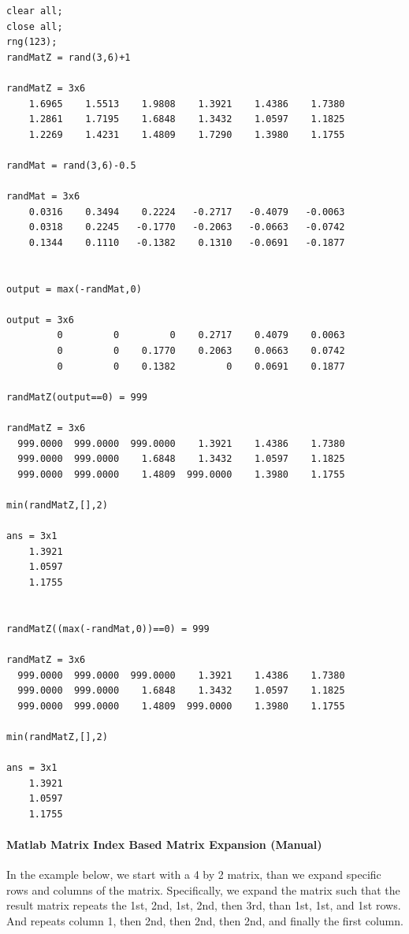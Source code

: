 \documentclass[
]{book}
\begin{document}
\begin{verbatim}
clear all;
close all;
rng(123);
randMatZ = rand(3,6)+1

randMatZ = 3x6    
    1.6965    1.5513    1.9808    1.3921    1.4386    1.7380
    1.2861    1.7195    1.6848    1.3432    1.0597    1.1825
    1.2269    1.4231    1.4809    1.7290    1.3980    1.1755

randMat = rand(3,6)-0.5

randMat = 3x6    
    0.0316    0.3494    0.2224   -0.2717   -0.4079   -0.0063
    0.0318    0.2245   -0.1770   -0.2063   -0.0663   -0.0742
    0.1344    0.1110   -0.1382    0.1310   -0.0691   -0.1877


output = max(-randMat,0)

output = 3x6    
         0         0         0    0.2717    0.4079    0.0063
         0         0    0.1770    0.2063    0.0663    0.0742
         0         0    0.1382         0    0.0691    0.1877

randMatZ(output==0) = 999

randMatZ = 3x6    
  999.0000  999.0000  999.0000    1.3921    1.4386    1.7380
  999.0000  999.0000    1.6848    1.3432    1.0597    1.1825
  999.0000  999.0000    1.4809  999.0000    1.3980    1.1755

min(randMatZ,[],2)

ans = 3x1    
    1.3921
    1.0597
    1.1755


randMatZ((max(-randMat,0))==0) = 999

randMatZ = 3x6    
  999.0000  999.0000  999.0000    1.3921    1.4386    1.7380
  999.0000  999.0000    1.6848    1.3432    1.0597    1.1825
  999.0000  999.0000    1.4809  999.0000    1.3980    1.1755

min(randMatZ,[],2)

ans = 3x1    
    1.3921
    1.0597
    1.1755
\end{verbatim}

\hypertarget{matlab-matrix-index-based-matrix-expansion-manual}{%
\paragraph{Matlab Matrix Index Based Matrix Expansion (Manual)}\label{matlab-matrix-index-based-matrix-expansion-manual}}

In the example below, we start with a 4 by 2 matrix, than we expand
specific rows and columns of the matrix. Specifically, we expand the
matrix such that the result matrix repeats the 1st, 2nd, 1st, 2nd, then
3rd, than 1st, 1st, and 1st rows. And repeats column 1, then 2nd, then
2nd, then 2nd, and finally the first column.
\end{document}

